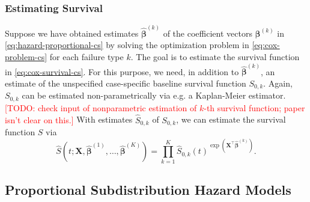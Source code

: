 \documentclass[11pt]{article}
\newcommand{\X}{\mathbf{X}}
\renewcommand{\b}{\bm{\beta}}
\begin{document}
\subsubsection{Estimating Survival}
Suppose we have obtained estimates $\widehat{\b}^{(k)}$ of the coefficient vectors $\b^{(k)}$ in \eqref{eq:hazard-proportional-cs} by solving the optimization problem in \eqref{eq:cox-problem-cs} for each failure type $k$. The goal is to estimate the survival function in \eqref{eq:cox-survival-cs}. For this purpose, we need, in addition to $\widehat{\b}^{(k)}$, an estimate of the unspecified case-specific baseline survival function $S_{0,k}$. Again, $S_{0,k}$ can be estimated non-parametrically via e.g. a Kaplan-Meier estimator. \textcolor{red}{[TODO: check input of nonparametric estimation of $k$-th survival function; paper isn't clear on this.]} With estimates $\widehat{S}_{0,k}$ of $S_{0,k}$, we can estimate the survival function $S$ via 
\[
	\widehat{S}\left(t; \X, \widehat{\b}^{(1)},\dots, \widehat{\b}^{(K)}\right) 
	=
	\prod_{k=1}^K \widehat{S}_{0,k}(t)^{\exp\left( \X^\top \widehat{\b}^{(k)}  \right)}.
\]

\subsection{Proportional Subdistribution Hazard Models}
\end{document}
